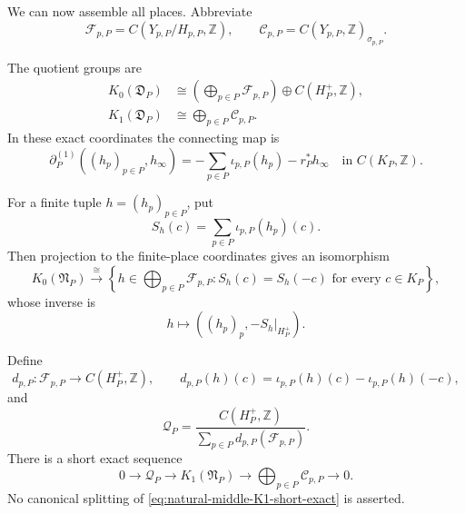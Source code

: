 We can now assemble all places.  Abbreviate
\begin{equation}
 \mathcal F_{p,P}=C(Y_{p,P}/H_{p,P},\mathbb Z),
 \qquad
 \mathcal C_{p,P}=C(Y_{p,P},\mathbb Z)_{\sigma_{p,P}}.
 \label{eq:finite-invariant-coinvariant-abbreviations}
\end{equation}

\begin{theorem}
\label{thm:full-natural-one-zero-k-theory}
The quotient groups are
\begin{align}
 K_0(\mathfrak D_P)
 &\cong
 \left(\bigoplus_{p\in P}\mathcal F_{p,P}\right)
 \oplus C(H_P^+,\mathbb Z),
 \label{eq:global-natural-boundary-K0}\\
 K_1(\mathfrak D_P)
 &\cong\bigoplus_{p\in P}\mathcal C_{p,P}.
 \label{eq:global-natural-boundary-K1}
\end{align}
In these exact coordinates the connecting map is
\begin{equation}
 \partial_P^{(1)}((h_p)_{p\in P},h_\infty)
 =-\sum_{p\in P}\iota_{p,P}(h_p)-r_P^*h_\infty
 \quad\text{in }C(K_P,\mathbb Z).
 \label{eq:global-full-unit-fibre-boundary-map}
\end{equation}

For a finite tuple \(h=(h_p)_{p\in P}\), put
\begin{equation}
 S_h(c)=\sum_{p\in P}\iota_{p,P}(h_p)(c).
 \label{eq:finite-place-sum-function}
\end{equation}
Then projection to the finite-place coordinates gives an isomorphism
\begin{equation}
 K_0(\mathfrak N_P)
 \xrightarrow{\ \cong\ }
 \left\{h\in\bigoplus_{p\in P}\mathcal F_{p,P}:
 S_h(c)=S_h(-c)\text{ for every }c\in K_P\right\},
 \label{eq:natural-middle-K0-exact-kernel}
\end{equation}
whose inverse is
\begin{equation}
 h\longmapsto((h_p)_p,-S_h|_{H_P^+}).
 \label{eq:natural-middle-K0-kernel-inverse}
\end{equation}

Define
\begin{equation}
 d_{p,P}:\mathcal F_{p,P}\longrightarrow C(H_P^+,\mathbb Z),
 \qquad
 d_{p,P}(h)(c)=\iota_{p,P}(h)(c)-\iota_{p,P}(h)(-c),
 \label{eq:finite-place-odd-difference-map}
\end{equation}
and
\begin{equation}
 \mathcal Q_P=
 \frac{C(H_P^+,\mathbb Z)}
 {\sum_{p\in P}d_{p,P}(\mathcal F_{p,P})}.
 \label{eq:global-unit-fibre-cokernel-coordinate}
\end{equation}
There is a short exact sequence
\begin{equation}
 0\longrightarrow\mathcal Q_P
 \longrightarrow K_1(\mathfrak N_P)
 \longrightarrow\bigoplus_{p\in P}\mathcal C_{p,P}
 \longrightarrow0.
 \label{eq:natural-middle-K1-short-exact}
\end{equation}
No canonical splitting of \eqref{eq:natural-middle-K1-short-exact} is
asserted.
\end{theorem}

